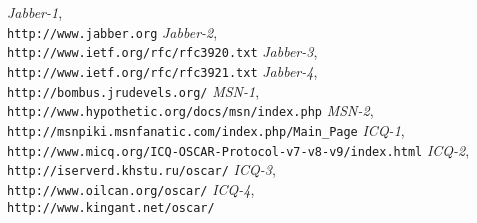 \begin{thebibliography}{9999}
 {\sl Jabber-1},\\
{\tt http://www.jabber.org}
 {\sl Jabber-2},\\
{\tt http://www.ietf.org/rfc/rfc3920.txt}
 {\sl Jabber-3},\\
{\tt http://www.ietf.org/rfc/rfc3921.txt}
 {\sl Jabber-4},\\
{\tt http://bombus.jrudevels.org/}
 {\sl MSN-1},\\
{\tt http://www.hypothetic.org/docs/msn/index.php}
 {\sl MSN-2},\\
{\tt http://msnpiki.msnfanatic.com/index.php/Main\_Page}
 {\sl ICQ-1},\\
{\tt http://www.micq.org/ICQ-OSCAR-Protocol-v7-v8-v9/index.html}
 {\sl ICQ-2},\\
{\tt http://iserverd.khstu.ru/oscar/}
 {\sl ICQ-3},\\
{\tt http://www.oilcan.org/oscar/}
 {\sl ICQ-4},\\
{\tt http://www.kingant.net/oscar/}
\end{thebibliography}